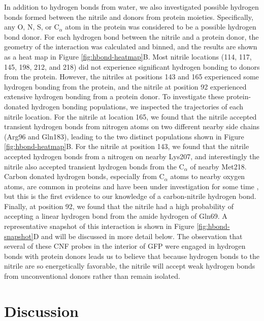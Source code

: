 In addition to hydrogen bonds from water, we also investigated possible hydrogen bonds formed between the nitrile and donors from protein moieties.
Specifically, any O, N, S, or C$_{\alpha}$ atom in the protein was considered to be a possible hydrogen bond donor.
For each hydrogen bond between the nitrile and a protein donor, the geometry of the interaction was calculated and binned, and the results are shown as a heat map in Figure \ref{fig:hbond-heatmap}B.
Most nitrile locations (114, 117, 145, 198, 212, and 218) did not experience significant hydrogen bonding to donors from the protein.
However, the nitriles at positions 143 and 165 experienced some hydrogen bonding from the protein, and the nitrile at position 92 experienced extensive hydrogen bonding from a protein donor.
To investigate these protein-donated hydrogen bonding populations, we inspected the trajectories of each nitrile location.
For the nitrile at location 165, we found that the nitrile accepted transient hydrogen bonds from nitrogen atoms on two different nearby side chains (Arg96 and Gln183), leading to the two distinct populations shown in Figure \ref{fig:hbond-heatmap}B.
For the nitrile at position 143, we found that the nitrile accepted hydrogen bonds from a nitrogen on nearby Lys207, and interestingly the nitrile also accepted transient hydrogen bonds from the C$_{\alpha}$ of nearby Met218.
Carbon donated hydrogen bonds, especially from C$_{\alpha}$ atoms to nearby oxygen atoms, are common in proteins and have been under investigation for some time \cite{Wahl1997, Scheiner2011, Horowitz2012}, but this is the first evidence to our knowledge of a carbon-nitrile hydrogen bond.
Finally, at position 92, we found that the nitrile had a high probability of accepting a linear hydrogen bond from the amide hydrogen of Gln69.
A representative snapshot of this interaction is shown in Figure \ref{fig:hbond-snapshot}D and will be discussed in more detail below.
The observation that several of these CNF probes in the interior of GFP were engaged in hydrogen bonds with protein donors leads us to believe that because hydrogen bonds to the nitrile are so energetically favorable, the nitrile will accept weak hydrogen bonds from unconventional donors rather than remain isolated.  

\section{Discussion}

